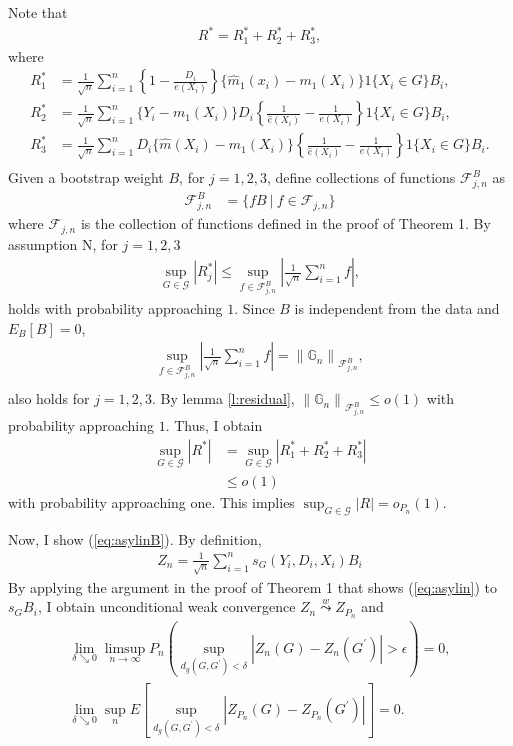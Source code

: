 \documentclass[12pt,oneside,reqno,english]{amsart}
\theoremstyle{definition}
\begin{document}
Note that 
\begin{align*}
R^{*}= R_{1}^{*}+R_{2}^{*}+R_{3}^{*},
\end{align*}
where 
\begin{align*}
 R_{1}^{*}&=\frac{1}{\sqrt{n}}\sum_{i=1}^{n}\left\{1-\frac{D_{i}}{e(X_{i})}\right\}\{\hat{m}_{1}(x_{i})-m_{1}(X_{i})\}1\{X_{i}\in G\}B_{i},\\
 R_{2}^{*}&=\frac{1}{\sqrt{n}}\sum_{i=1}^{n}\{Y_{i}-m_{1}(X_{i})\}D_{i}\left\{\frac{1}{\hat{e}(X_{i})}-\frac{1}{e(X_{i})}\right\}1\{X_{i}\in G\}B_{i},\\
 R_{3}^{*}&=\frac{1}{\sqrt{n}}\sum_{i=1}^{n}D_{i}\{\hat{m}(X_{i})-m_{1}(X_{i})\}\left\{\frac{1}{\hat{e}(X_{i})}-\frac{1}{e(X_{i})}\right\}1\{X_{i}\in G\}B_{i}.\\
\end{align*}
Given a bootstrap weight $B$, for $j=1,2,3$, define collections of functions $\mathcal{F}^{B}_{j,n}$ as
\begin{align*}
\mathcal{F}_{j,n}^{B}&=\{ fB\ | \ f\in \mathcal{F}_{j,n}\}
\end{align*}
where $\mathcal{F}_{j,n}$ is the collection of functions defined in the proof of Theorem 1. 
By assumption N, for $j=1,2,3$
\begin{align*}
\sup_{G\in \mathcal{G}}|R_{j}^{*}|\leq \sup_{f\in \mathcal{F}_{j,n}^{B}}\left|\frac{1}{\sqrt{n}}\sum_{i=1}^{n}f\right|,
\end{align*}
holds with probability approaching $1$. Since $B$ is independent from the data and $E_{B}[B]=0$,
\begin{align*}
 \sup_{f\in \mathcal{F}_{j,n}^{B}}\left|\frac{1}{\sqrt{n}}\sum_{i=1}^{n}f\right|=\left\|\mathbb{G}_{n}\right\|_{\mathcal{F}_{j,n}^{B}},\\
\end{align*}
also holds for $j=1,2,3$. By lemma \ref{l:residual}, 
$\left\|\mathbb{G}_{n}\right\|_{\mathcal{F}_{j,n}^{B}}\leq o(1)$ with probability approaching $1$. 
Thus, I obtain   
\begin{align*}
\sup_{G\in \mathcal{G}}|R^{*}|&=\sup_{G\in \mathcal{G}}|R^{*}_{1}+R^{*}_{2}+R^{*}_{3}|\\
&\leq o(1)
\end{align*}
with probability approaching one. This implies $\sup_{G\in \mathcal{G}}|R|=o_{P_{n}}(1)$.

Now, I show (\ref{eq:asylinB}).  
By definition, 
\begin{align*}
Z_{n}=\frac{1}{\sqrt{n}}\sum_{i=1}^{n}s_{G}(Y_{i},D_{i},X_{i})B_{i}
\end{align*}
By applying the argument in the proof of Theorem 1 that shows (\ref{eq:asylin}) to $s_{G}B_{i}$, I obtain  
unconditional weak convergence $Z_{n}\overset{w}{\underset{}{\leadsto}}Z_{P_{n}}$
and 
\begin{align*}
\lim_{\delta\searrow 0}\limsup_{n\rightarrow \infty}P_{n}(\sup_{d_{g}(G,G^{\prime})<\delta}|Z_{n}(G)-Z_{n}(G^{\prime})|>\epsilon )=0,\\
\lim_{\delta\searrow 0}\sup_{n}E[\sup_{d_{g}(G,G^{\prime})<\delta}|Z_{P_{n}}(G)-Z_{P_{n}}(G^{\prime})|]=0.
\end{align*}
\end{document}
